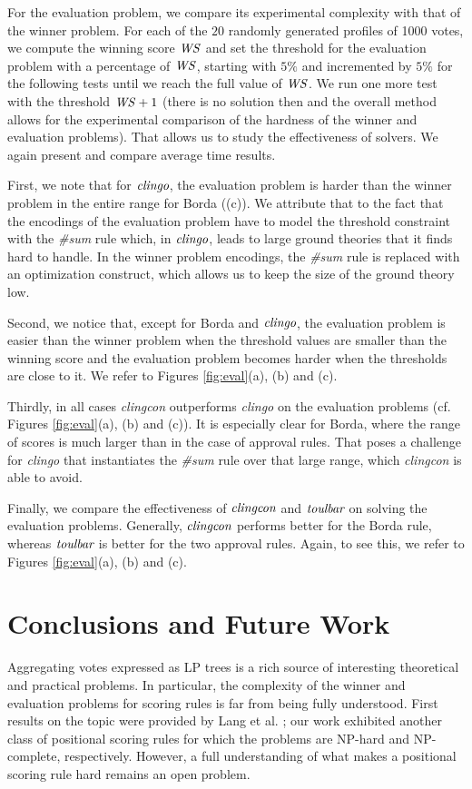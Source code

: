 For the evaluation problem, we compare its experimental complexity with
that of the winner problem. For each of the $20$ randomly generated profiles
of 1000 votes, we
compute the winning score $\mathit{WS}$ and set the threshold for the evaluation problem
with a percentage of $\mathit{WS}$, starting with $5\%$ and incremented by $5\%$ for the
following tests until we reach the full value of $\mathit{WS}$. We run one more test with the
threshold $\mathit{WS} +1$ (there is no solution then and the overall method allows for the
experimental comparison of the hardness of the winner and evaluation problems).
That allows us to study the effectiveness of solvers. We again present and
compare average time results.

First, we note that for $\textit{clingo}$, the evaluation problem is
harder than the winner problem in the entire range for Borda ((c)).
We attribute that to the fact that the encodings 
of the evaluation problem have to model the threshold constraint with the 
\textit{\#sum} rule which, in $\textit{clingo}$, leads to large ground theories 
that it finds hard to handle. In the winner problem encodings, the \textit{\#sum} 
rule is replaced with an optimization construct, which allows us to keep
the size of the ground theory low.

Second, we notice that, except for Borda and $\textit{clingo}$,
the evaluation problem is easier than the winner problem
when the threshold values are smaller than the winning score and 
the evaluation problem becomes harder when the thresholds are close to it.
We refer to Figures \ref{fig:eval}(a), (b) and (c).

Thirdly, in all cases \emph{clingcon} outperforms \emph{clingo} on the
evaluation problems (cf. Figures \ref{fig:eval}(a), (b) and (c)). 
It is especially clear for Borda, where the range of
scores is much larger than in the case of approval rules. That poses a
challenge for \emph{clingo} that instantiates the \textit{\#sum} rule over
that large range, which \emph{clingcon} is able to avoid.

Finally, we compare the effectiveness of $\textit{clingcon}$ and $\textit{toulbar}$ on
solving the evaluation problems. Generally, $\textit{clingcon}$ performs better
for the Borda rule, whereas $\textit{toulbar}$ is better for the two approval rules.
Again, to see this, we refer to Figures \ref{fig:eval}(a), (b) and (c).


\section{Conclusions and Future Work}
Aggregating votes expressed as LP trees is a rich source of interesting
theoretical and practical problems. In particular, the complexity of the
winner and evaluation problems for scoring rules is far from
being fully understood. First results on the topic were provided by 
Lang et al. \cite{lang:aggLP}; our work exhibited another class of positional
scoring rules for which the problems are NP-hard and NP-complete, 
respectively. However, a full understanding of what makes a positional 
scoring rule hard remains an open problem.

